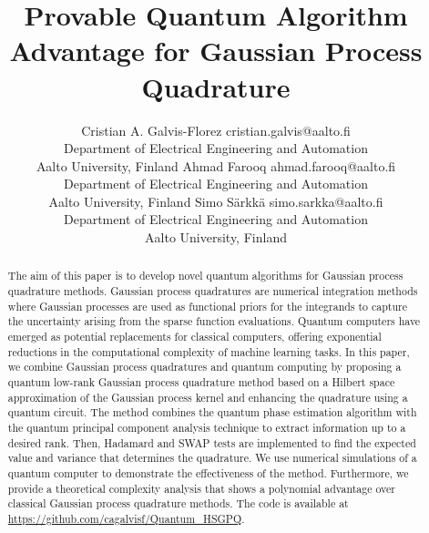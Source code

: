 \documentclass[10pt]{article}
\title{Provable Quantum Algorithm Advantage for Gaussian Process Quadrature}
\author{\name Cristian A. Galvis-Florez \email cristian.galvis@aalto.fi \\
	\addr Department of Electrical Engineering and Automation\\
	Aalto University, Finland
	\AND
	\name Ahmad Farooq \email ahmad.farooq@aalto.fi \\
	\addr Department of Electrical Engineering and Automation\\
	Aalto University, Finland
	\AND
	\name Simo S\"arkk\"a \email simo.sarkka@aalto.fi\\
	\addr Department of Electrical Engineering and Automation\\
	Aalto University, Finland}
\begin{document}
	
	
	\maketitle
	\begin{abstract}
		The aim of this paper is to develop novel quantum algorithms for Gaussian process quadrature methods. Gaussian process quadratures are numerical integration methods where Gaussian processes are used as functional priors for the integrands to capture the uncertainty arising from the sparse function evaluations. Quantum computers have emerged as potential replacements for classical computers, offering exponential reductions in the computational complexity of machine learning tasks. In this paper, we combine Gaussian process quadratures and quantum computing by proposing a quantum low-rank Gaussian process quadrature method based on a Hilbert space approximation of the Gaussian process kernel and enhancing the quadrature using a quantum circuit.
		The method combines the quantum phase estimation algorithm with the quantum principal component analysis technique to extract information up to a desired rank. Then, Hadamard and SWAP tests are implemented to find the expected value and variance that determines the quadrature.
		We use numerical simulations of a quantum computer to demonstrate the effectiveness of the method. Furthermore, we provide a theoretical complexity analysis that shows a polynomial advantage over classical Gaussian process quadrature methods.  The code is available at \url{https://github.com/cagalvisf/Quantum_HSGPQ}.
	\end{abstract}
	\newpage
\end{document}
